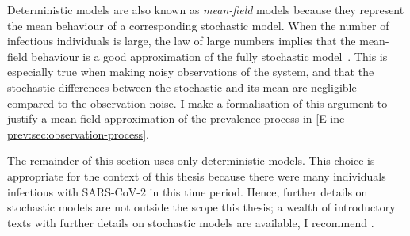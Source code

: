\documentclass[thesis.tex]{subfiles}
\begin{document}
Deterministic models are also known as \emph{mean-field} models because they represent the mean behaviour of a corresponding stochastic model.
When the number of infectious individuals is large, the law of large numbers implies that the mean-field behaviour is a good approximation of the fully stochastic model~\autocite[20]{diekmannMathematical}.
This is especially true when making noisy observations of the system, and that the stochastic differences between the stochastic and its mean are negligible compared to the observation noise.
I make a formalisation of this argument to justify a mean-field approximation of the prevalence process in \cref{E-inc-prev:sec:observation-process}.

The remainder of this section uses only deterministic models.
This choice is appropriate for the context of this thesis because there were many individuals infectious with SARS-CoV-2 in this time period.
Hence, further details on stochastic models are not outside the scope this thesis; a wealth of introductory texts with further details on stochastic models are available, I recommend \textcite[chapter 6]{keelingModeling}.




\end{document}
